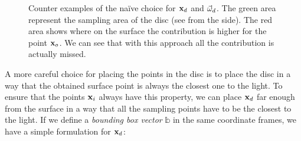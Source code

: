 \begin{figure}
\centering
{}
\caption{Counter examples of the na\"{i}ve choice for $\mathbf{x}_d$ and $\vec{\omega}_d$. The green area represent the sampling area of the disc (see from the side). The red area shows where on the surface the contribution is higher for the point $\mathbf{x}_o$. We can see that with this approach all the contribution is actually missed.}
\label{fig:discwrong}
\end{figure}

A more careful choice for placing the points in the disc is to place the disc in a way that the obtained surface point is always the closest one to the light. To ensure that the points $\mathbf{x}_i$ always have this property, we can place $\mathbf{x}_d$ far enough from the surface in a way that all the sampling points have to be the closest to the light. If we define a \emph{bounding box vector} $\mathbb{b}$ in the same coordinate frames, we have a simple formulation for $\mathbf{x}_d$:

